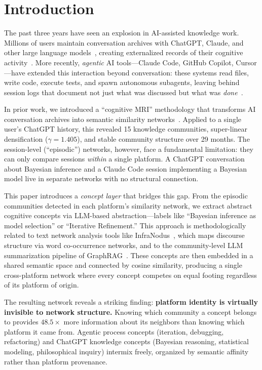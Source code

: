 \documentclass[11pt,twocolumn]{article}
\begin{document}
\section{Introduction}
\label{sec:intro}

The past three years have seen an explosion in AI-assisted knowledge work.
Millions of users maintain conversation archives with ChatGPT, Claude, and other large language models~\citep{zhao2024wildchat}, creating externalized records of their cognitive activity~\citep{zhao2023survey}.
More recently, \emph{agentic} AI tools---Claude Code, GitHub Copilot, Cursor---have extended this interaction beyond conversation: these systems read files, write code, execute tests, and spawn autonomous subagents, leaving behind session logs that document not just what was discussed but what was \emph{done}~\citep{wang2024survey}.

In prior work, we introduced a ``cognitive MRI'' methodology that transforms AI conversation archives into semantic similarity networks~\citep{towell2025cognitive,towell2026temporal}.
Applied to a single user's ChatGPT history, this revealed 15 knowledge communities, super-linear densification ($\gamma = 1.405$), and stable community structure over 29 months.
The session-level (``episodic'') networks, however, face a fundamental limitation: they can only compare sessions \emph{within} a single platform.
A ChatGPT conversation about Bayesian inference and a Claude Code session implementing a Bayesian model live in separate networks with no structural connection.

This paper introduces a \emph{concept layer} that bridges this gap.
From the episodic communities detected in each platform's similarity network, we extract abstract cognitive concepts via LLM-based abstraction---labels like ``Bayesian inference as model selection'' or ``Iterative Refinement.''
This approach is methodologically related to text network analysis tools like InfraNodus~\citep{paranyushkin2019infranodus}, which maps discourse structure via word co-occurrence networks, and to the community-level LLM summarization pipeline of GraphRAG~\citep{edge2024graphrag}.
These concepts are then embedded in a shared semantic space and connected by cosine similarity, producing a single cross-platform network where every concept competes on equal footing regardless of its platform of origin.

The resulting network reveals a striking finding: \textbf{platform identity is virtually invisible to network structure.}
Knowing which community a concept belongs to provides $48.5\times$ more information about its neighbors than knowing which platform it came from.
Agentic process concepts (iteration, debugging, refactoring) and ChatGPT knowledge concepts (Bayesian reasoning, statistical modeling, philosophical inquiry) intermix freely, organized by semantic affinity rather than platform provenance.
\end{document}
